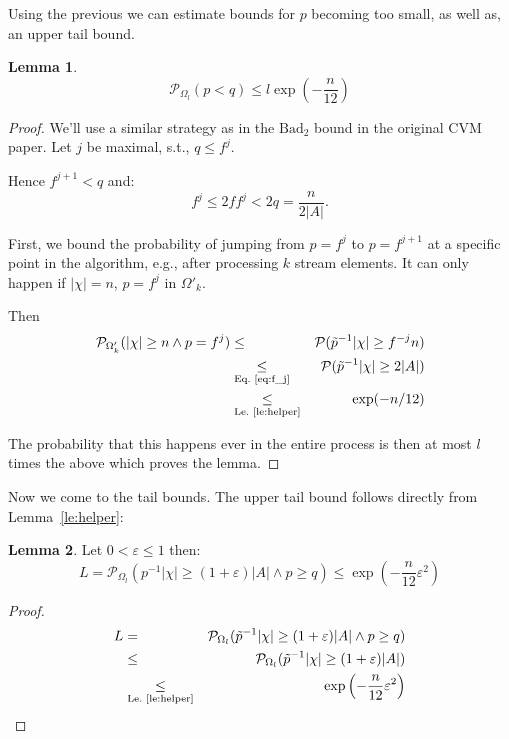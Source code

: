 \documentclass{article}
\newcommand{\prob}{\mathcal P}
\newcommand{\eps}{\varepsilon}
\theoremstyle{definition}
\newtheorem{lemma}{Lemma}
\begin{document}
Using the previous we can estimate bounds for $p$ becoming too small, as well as, an upper tail bound.
\begin{lemma}\label{le:low_p}
\[
\prob_{\Omega_l}(p < q) \leq l \exp\left( - \frac{n}{12}\right)
\]
\end{lemma}
\begin{proof}
We'll use a similar strategy as in the $\mathrm{Bad}_2$ bound in the original CVM paper.
Let $j$ be maximal, s.t., $q \leq f^j$.

Hence $f^{j+1} < q$ and:
\begin{equation}
\label{eq:f_j}
  f^j \leq 2f f^j < 2q = \frac{n}{2|A|} \textrm{.}
\end{equation}

First, we bound the probability of jumping from $p=f^j$ to $p=f^{j+1}$ at a specific point in the algorithm, e.g., after processing $k$ stream elements.
It can only happen if $|\chi|=n$, $p=f^j$ in $\Omega'_k$.

Then
\begin{eqnarray*}
  \prob_{\Omega'_k} ( |\chi| \geq n \wedge p=f^j) & \leq & \prob( \tilde{p}^{-1} |\chi| \geq f^{-j} n ) \\
    & \underset{\textrm{Eq.~\ref{eq:f_j}}}{\leq} & \prob( \tilde{p}^{-1} |\chi| \geq 2|A| ) \\
    & \underset{\textrm{Le.~\ref{le:helper}}}{\leq} & \exp( - n/12)
\end{eqnarray*}

The probability that this happens ever in the entire process is then at most $l$ times the above which proves the lemma.
\end{proof}

Now we come to the tail bounds. The upper tail bound follows directly from Lemma~\ref{le:helper}:
\begin{lemma}\label{le:upper_tail}
Let $0 < \eps \leq 1$ then:
\[
  L = \prob_{\Omega_l} ( p^{-1} |\chi| \geq (1+\eps)|A| \wedge p \geq q) \leq \exp\left(-\frac{n}{12} \eps^2\right)
\]
\end{lemma}
\begin{proof}
\begin{eqnarray*}
  L & =&  \prob_{\Omega_l} ( \tilde{p}^{-1} |\chi| \geq (1+\eps)|A| \wedge p \geq q) \\
  & \leq & \prob_{\Omega_l} ( \tilde{p}^{-1} |\chi| \geq (1+\eps)|A| ) \\
  & \underset{\textrm{Le.~\ref{le:helper}}}{\leq}  &  \exp\left(-\frac{n}{12} \eps^2\right)
\end{eqnarray*}
\end{proof}
\end{document}

